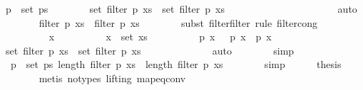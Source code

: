 \begin{isabellebody}
\ {\isachardoublequoteopen}p{\isacharprime}\ {\isasymin}\ set\ ps{\isachardoublequoteclose}\isanewline
\ \ \ \ \ \ \isamarkupfalse%
\ {\isachardoublequoteopen}set\ {\isacharparenleft}filter\ p\ xs{\isacharparenright}\ {\isasyminter}\ set\ {\isacharparenleft}filter\ p{\isacharprime}\ xs{\isacharparenright}\ {\isacharequal}\ {\isacharbraceleft}{\isacharbraceright}{\isachardoublequoteclose}\isanewline
\ \ \ \ \ \ \ \ \isamarkupfalse%
\ {\isacharasterisk}\isanewline
\ \ \ \ \ \ \ \ \isamarkupfalse%
\ auto\isanewline
\ \ \ \ \ \ \isamarkupfalse%
\ {\isachardoublequoteopen}filter\ p{\isacharprime}\ xs\ {\isacharequal}\ filter\ p{\isacharprime}\ {\isacharquery}xs{\isacharprime}{\isachardoublequoteclose}\isanewline
\ \ \ \ \ \ \isamarkupfalse%
\ {\isacharparenleft}subst\ filter{\isacharunderscore}filter{\isacharcomma}\ rule\ filter{\isacharunderscore}cong{\isacharparenright}\isanewline
\ \ \ \ \ \ \ \ \isamarkupfalse%
\ x\isanewline
\ \ \ \ \ \ \ \ \isamarkupfalse%
\ {\isachardoublequoteopen}x\ {\isasymin}\ set\ xs{\isachardoublequoteclose}\isanewline
\ \ \ \ \ \ \ \ \isamarkupfalse%
\ {\isachardoublequoteopen}p{\isacharprime}\ x\ {\isacharequal}\ {\isacharparenleft}{\isasymnot}\ p\ x\ {\isasymand}\ p{\isacharprime}\ x{\isacharparenright}{\isachardoublequoteclose}\isanewline
\ \ \ \ \ \ \ \ \ \ \isamarkupfalse%
\ {\isacharbackquoteopen}set\ {\isacharparenleft}filter\ p\ xs{\isacharparenright}\ {\isasyminter}\ set\ {\isacharparenleft}filter\ p{\isacharprime}\ xs{\isacharparenright}\ {\isacharequal}\ {\isacharbraceleft}{\isacharbraceright}{\isacharbackquoteclose}\isanewline
\ \ \ \ \ \ \ \ \ \ \isamarkupfalse%
\ auto\isanewline
\ \ \ \ \ \ \isamarkupfalse%
\ simp\isanewline
\ \ \ \ \isamarkupfalse%
\isanewline
\ \ \ \ \isamarkupfalse%
\ \isamarkupfalse%
\ {\isachardoublequoteopen}{\isasymforall}\ p\ {\isasymin}\ set\ ps{\isachardot}\ length\ {\isacharparenleft}filter\ p\ xs{\isacharparenright}\ {\isacharequal}\ length\ {\isacharparenleft}filter\ p\ {\isacharquery}xs{\isacharprime}{\isacharparenright}{\isachardoublequoteclose}\isanewline
\ \ \ \ \ \ \isamarkupfalse%
\ simp\isanewline
\ \ \ \ \isamarkupfalse%
\ {\isacharquery}thesis\isanewline
\ \ \ \ \ \ \isamarkupfalse%
\ {\isacharparenleft}metis\ {\isacharparenleft}no{\isacharunderscore}types{\isacharcomma}\ lifting{\isacharparenright}\ map{\isacharunderscore}eq{\isacharunderscore}conv{\isacharparenright}\isanewline

\end{isabellebody}
